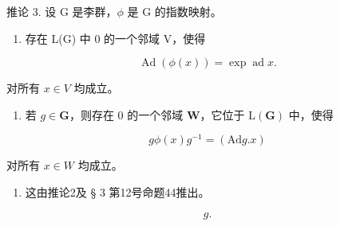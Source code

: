 推论 3. 设 G 是李群，\(\phi\) 是 G 的指数映射。

\begin{enumerate}
\def\labelenumi{(\roman{enumi})}
\tightlist
\item
  存在 L(G) 中 0 的一个邻域 V，使得
\end{enumerate}

\[
\operatorname{Ad} (\phi (x)) = \exp \operatorname{ad} x.
\]

对所有 \(x \in V\) 均成立。

\begin{enumerate}
\def\labelenumi{(\roman{enumi})}
\setcounter{enumi}{1}
\tightlist
\item
  若 \(g \in \mathbf{G}\)，则存在 0 的一个邻域 \(\mathbf{W}\)，它位于 \(\mathrm{L}(\mathbf{G})\) 中，使得
\end{enumerate}

\[
g \phi (x) g ^ {- 1} = (\mathrm{Ad} g. x)
\]

对所有 \(x \in W\) 均成立。

\begin{enumerate}
\def\labelenumi{(\roman{enumi})}
\tightlist
\item
  这由推论2及 § 3 第12号命题44推出。
\end{enumerate}

\[
g.
\]

